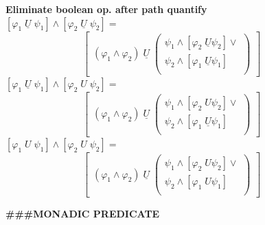 \documentclass{article}
\begin{document}
\begin{multicols}{4}
\textbf{Eliminate boolean op. after path quantify}\\
$[\varphi_1\; \underline{U}\; \psi_1] \wedge [\varphi_2\; \underline{U}\; \psi_2] =$\\
$\qquad\qquad\qquad\qquad\begin{bmatrix}
  (\varphi_1 \wedge \varphi_2) \; \underline{U} \; 
  	\begin{pmatrix}
  		\psi_1 \wedge [\varphi_2 \; \underline{U} \psi_2] \vee \\
  		\psi_2 \wedge [\varphi_1 \; \underline{U} \psi_1]\;\;\\
	\end{pmatrix}
  \end{bmatrix}$
$[\varphi_1\; \underline{U}\; \psi_1] \wedge [\varphi_2\; U\; \psi_2] =$\\
$\qquad\qquad\qquad\qquad\begin{bmatrix}
  (\varphi_1 \wedge \varphi_2) \; \underline{U} \; 
  	\begin{pmatrix}
  		\psi_1 \wedge [\varphi_2 \; U \psi_2] \vee \\
  		\psi_2 \wedge [\varphi_1 \; \underline{U} \psi_1]\;\;\\
	\end{pmatrix}
  \end{bmatrix}$
$[\varphi_1\; U\; \psi_1] \wedge [\varphi_2\; U\; \psi_2] =$\\
$\qquad\qquad\qquad\qquad\begin{bmatrix}
  (\varphi_1 \wedge \varphi_2) \; \underline{U} \; 
  	\begin{pmatrix}
  		\psi_1 \wedge [\varphi_2 \; U \psi_2] \vee \\
  		\psi_2 \wedge [\varphi_1 \; U \psi_1]\;\;\\
	\end{pmatrix}
  \end{bmatrix}$

\textbf{\#\#\#MONADIC PREDICATE} \\


\end{multicols}
\end{document}
